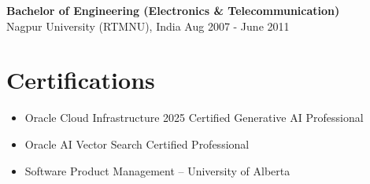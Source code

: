 \documentclass[11pt,a4paper]{article}
\begin{document}
\textbf{Bachelor of Engineering (Electronics \& Telecommunication)} \\
Nagpur University (RTMNU), India \hfill Aug 2007 - June 2011

\section*{Certifications}

\begin{itemize}
    \item Oracle Cloud Infrastructure 2025 Certified Generative AI Professional
    
    \item Oracle AI Vector Search Certified Professional
    
    \item Software Product Management -- University of Alberta

\end{itemize}
\end{document}
